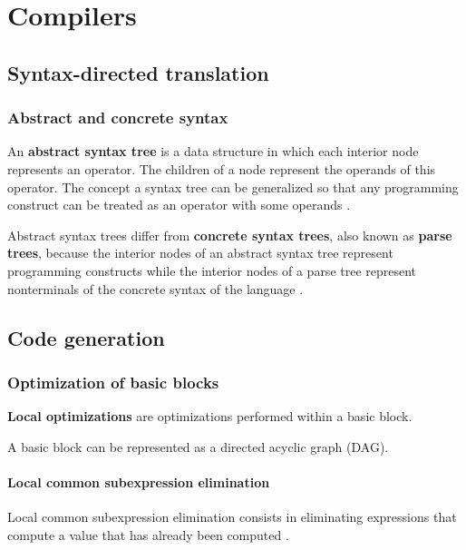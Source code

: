 \chapter{Compilers}

\section{Syntax-directed translation}

\subsection{Abstract and concrete syntax}\label{Abstract and concrete syntax}

An \textbf{abstract syntax tree} is a data structure in which each interior node represents an operator. The children of a node represent the operands of this operator.
The concept a syntax tree can be generalized so that any programming construct can be treated as an operator with some operands \cite[p.~69]{compilers-aho-2007}.

Abstract syntax trees differ from \textbf{concrete syntax trees}, also known as \textbf{parse trees}, because the interior nodes of an abstract syntax tree represent programming constructs while the interior nodes of a parse tree represent nonterminals of the concrete syntax of the language \cite[p.~69]{compilers-aho-2007}.

\section{Code generation}

\subsection{Optimization of basic blocks}

\textbf{Local optimizations} are optimizations performed within a basic block.

A basic block can be represented as a directed acyclic graph (DAG).

\subsubsection{Local common subexpression elimination}

Local common subexpression elimination consists in eliminating expressions that compute a value that has already been computed \cite[p.~533]{compilers-aho-2007}.

